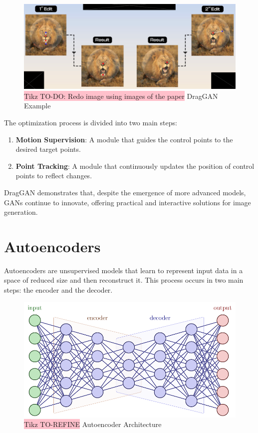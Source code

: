 \begin{figure}[!htbp]
    \centering
    \includegraphics[width=0.75\linewidth]{tikz/chapter9 - DragGAN.pdf}
    \caption{{\color{red}\colorbox{pink}{Tikz TO-DO: Redo image using images of the paper}} DragGAN Example}
\end{figure}

The optimization process is divided into two main steps:
\begin{enumerate}
    \item \textbf{Motion Supervision}: A module that guides the control points to the desired target points.
    \item \textbf{Point Tracking}: A module that continuously updates the position of control points to reflect changes.
\end{enumerate}

DragGAN demonstrates that, despite the emergence of more advanced models, GANs continue to innovate, offering practical and interactive solutions for image generation.


\section{Autoencoders}

Autoencoders are unsupervised models that learn to represent input data in a space of reduced size and then reconstruct it. This process occurs in two main steps: the encoder and the decoder.

\begin{figure}[!htbp]
    \centering
    \includegraphics[width=\linewidth]{tikz/chapter9 - Autoencoder.pdf}
    \caption{{\color{red}\colorbox{pink}{Tikz TO-REFINE}} Autoencoder Architecture}
\end{figure}


